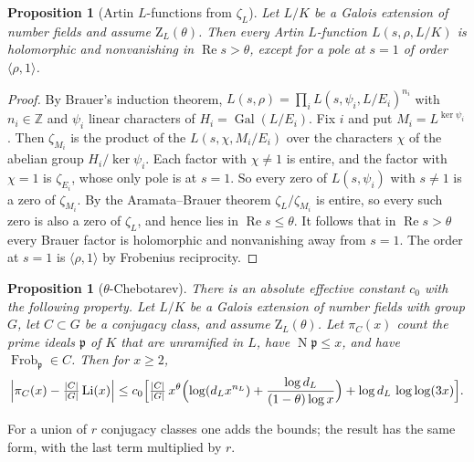 \documentclass[11pt]{amsart}
\newtheorem{proposition}[theorem]{Proposition}
\theoremstyle{definition}
\theoremstyle{remark}
\newcommand{\Z}{\mathbb{Z}}
\newcommand{\fp}{\mathfrak{p}}
\DeclareMathOperator{\Gal}{Gal}
\DeclareMathOperator{\Li}{Li}
\DeclareMathOperator{\Frob}{Frob}
\DeclareMathOperator{\Nm}{N}
\newcommand{\Zt}{\mathrm{Z}}       %
\begin{document}
\begin{proposition}[Artin $L$-functions from $\zeta_L$]\label{prop:artin}
Let $L/K$ be a Galois extension of number fields and assume $\Zt_L(\theta)$. Then every Artin $L$-function
$L(s,\rho,L/K)$ is holomorphic and nonvanishing in $\operatorname{Re}s>\theta$, except for a pole at $s=1$ of order
$\langle\rho,1\rangle$.
\end{proposition}

\begin{proof}
By Brauer's induction theorem, $L(s,\rho)=\prod_iL(s,\psi_i,L/E_i)^{n_i}$ with $n_i\in\Z$ and $\psi_i$ linear
characters of $H_i=\Gal(L/E_i)$. Fix $i$ and put $M_i=L^{\ker\psi_i}$. Then $\zeta_{M_i}$ is the product of the
$L(s,\chi,M_i/E_i)$ over the characters $\chi$ of the abelian group $H_i/\ker\psi_i$. Each factor with $\chi\neq1$ is
entire, and the factor with $\chi=1$ is $\zeta_{E_i}$, whose only pole is at $s=1$. So every zero of
$L(s,\psi_i)$ with $s\ne1$ is a zero of $\zeta_{M_i}$. By the Aramata--Brauer theorem $\zeta_L/\zeta_{M_i}$ is entire,
so every such zero is also a zero of $\zeta_L$, and hence lies in $\operatorname{Re}s\le\theta$. It follows that in
$\operatorname{Re}s>\theta$ every Brauer factor is holomorphic and nonvanishing away from $s=1$. The order at $s=1$ is
$\langle\rho,1\rangle$ by Frobenius reciprocity.
\end{proof}

\begin{proposition}[$\theta$-Chebotarev]\label{prop:cheb}
There is an absolute effective constant $c_0$ with the following property. Let $L/K$ be a Galois extension of number
fields with group $G$, let $C\subset G$ be a conjugacy class, and assume $\Zt_L(\theta)$. Let $\pi_C(x)$ count
the prime ideals $\fp$ of $K$ that are unramified in $L$, have $\Nm\fp\le x$, and have $\Frob_\fp\in C$. Then for
$x\ge2$,
\[
  \Bigl|\pi_C(x)-\tfrac{|C|}{|G|}\Li(x)\Bigr|
  \le c_0\Bigl[\tfrac{|C|}{|G|}\,x^{\theta}\Bigl(\log(d_Lx^{n_L})+\frac{\log d_L}{(1-\theta)\log x}\Bigr)+\log d_L\,\log\log(3x)\Bigr].
\]
\end{proposition}

For a union of $r$ conjugacy classes one adds the bounds; the result has the same form, with the last term multiplied
by $r$.
\end{document}
